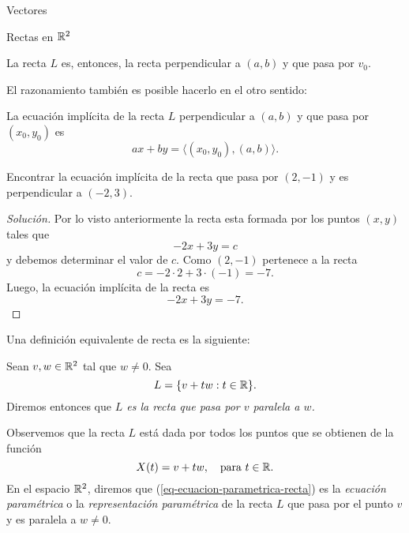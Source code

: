 \begin{chapter}{Vectores}
\begin{section}{Rectas en $\mathbb R^2$}
\begin{observacion*}
    La recta $L$ es, entonces, la recta perpendicular a $(a,b)$ y que pasa por $v_0$. 
    
    \end{observacion*}

    El  razonamiento también es posible hacerlo en el otro sentido: 

    \begin{resultado}\label{res-recta-perp}
        {La ecuación implícita de la recta $L$ perpendicular a $(a,b)$ y que pasa por $(x_0,y_0)$ es
            \begin{equation*}
            ax +by = \langle (x_0,y_0), (a,b) \rangle.
            \end{equation*}}
    \end{resultado}

\begin{ejemplo*}
    Encontrar la ecuación implícita de la recta que pasa por $(2,-1)$ y  es perpendicular a $(-2,3)$.
\end{ejemplo*}
\begin{proof}[Solución]
Por lo visto anteriormente la recta esta formada por los puntos  $(x,y)$ tales que
    \begin{equation*}
            -2x+3y = c
    \end{equation*}
     y debemos determinar el valor de $c$. Como $(2,-1)$ pertenece a la recta
     \begin{equation*}
     c = -2\cdot 2+3\cdot (-1) = -7.
     \end{equation*}
     Luego, la ecuación implícita de la recta es
     \begin{equation*}
     -2x+3y = -7.
     \end{equation*}
\end{proof}


    Una definición equivalente de recta es la siguiente:
    
        \begin{definicion}
            Sean $v, w \in \mathbb R^2$ tal que  $w \not=0$. Sea 
            \begin{equation*}
            L = \{v + tw: t \in \mathbb R\}. 
            \end{equation*}
            Diremos entonces que  \textit{$L$ es la recta que pasa por $v$ paralela a $w$.} 
        \end{definicion}
        
    Observemos que la recta $L$ está dada por todos los puntos que se obtienen de la función
    \begin{equation}\label{eq-ecuacion-parametrica-recta}
    X(t) =v +tw, \quad \text{para $t \in \mathbb R$.} 
    \end{equation} 
    En  el espacio $\mathbb R^2$, diremos que (\ref{eq-ecuacion-parametrica-recta}) es la \textit{ecuación paramétrica} o la \textit{representación paramétrica} de la recta $L$ que pasa por el punto $v$ y es paralela a $w \ne 0$.
        




\end{section}
\end{chapter}
